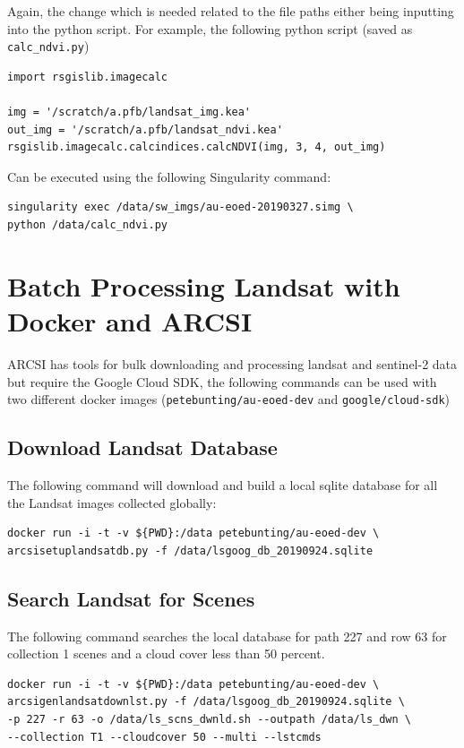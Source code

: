 \documentclass[authoryear, 11pt, oneside]{report}
\begin{document}
Again, the change which is needed related to the file paths either being inputting into the python script. For example, the following python script (saved as \texttt{calc_ndvi.py})

\begin{verbatim}
import rsgislib.imagecalc

img = '/scratch/a.pfb/landsat_img.kea'
out_img = '/scratch/a.pfb/landsat_ndvi.kea'
rsgislib.imagecalc.calcindices.calcNDVI(img, 3, 4, out_img)

\end{verbatim}

Can be executed using the following Singularity command:

\begin{verbatim}
singularity exec /data/sw_imgs/au-eoed-20190327.simg \
python /data/calc_ndvi.py
\end{verbatim}

\chapter{Batch Processing Landsat with Docker and ARCSI}

ARCSI has tools for bulk downloading and processing landsat and sentinel-2 data but require the Google Cloud SDK, the following commands can be used with two different docker images (\texttt{petebunting/au-eoed-dev} and \texttt{google/cloud-sdk})

\section{Download Landsat Database}
The following command will download and build a local sqlite database for all the Landsat images collected globally:
\begin{verbatim}
docker run -i -t -v ${PWD}:/data petebunting/au-eoed-dev \
arcsisetuplandsatdb.py -f /data/lsgoog_db_20190924.sqlite
\end{verbatim}

\section{Search Landsat for Scenes}
The following command searches the local database for path 227 and row 63 for collection 1 scenes and a cloud cover less than 50 percent.
\begin{verbatim}
docker run -i -t -v ${PWD}:/data petebunting/au-eoed-dev \
arcsigenlandsatdownlst.py -f /data/lsgoog_db_20190924.sqlite \
-p 227 -r 63 -o /data/ls_scns_dwnld.sh --outpath /data/ls_dwn \
--collection T1 --cloudcover 50 --multi --lstcmds
\end{verbatim}
\end{document}
